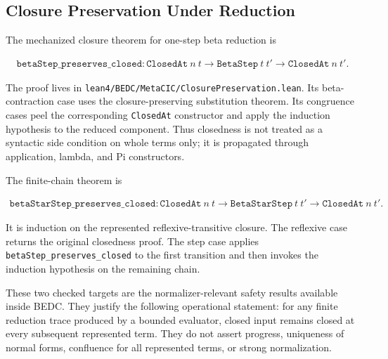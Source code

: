 \subsection{Closure Preservation Under Reduction}
\label{subsec:metacic-normalization-closure}

The mechanized closure theorem for one-step beta reduction is

$$
\begin{aligned}
  \texttt{betaStep\_preserves\_closed} :
  \texttt{ClosedAt}\ n\ t \to
  \texttt{BetaStep}\ t\ t' \to
  \texttt{ClosedAt}\ n\ t' .
\end{aligned}
$$

The proof lives in
\texttt{lean4/BEDC/MetaCIC/ClosurePreservation.lean}. Its beta-contraction
case uses the closure-preserving substitution theorem. Its congruence cases
peel the corresponding \texttt{ClosedAt} constructor and apply the induction
hypothesis to the reduced component. Thus closedness is not treated as a
syntactic side condition on whole terms only; it is propagated through
application, lambda, and Pi constructors.

The finite-chain theorem is

$$
\begin{aligned}
  \texttt{betaStarStep\_preserves\_closed} :
  \texttt{ClosedAt}\ n\ t \to
  \texttt{BetaStarStep}\ t\ t' \to
  \texttt{ClosedAt}\ n\ t' .
\end{aligned}
$$

It is induction on the represented reflexive-transitive closure. The reflexive
case returns the original closedness proof. The step case applies
\texttt{betaStep\_preserves\_closed} to the first transition and then invokes
the induction hypothesis on the remaining chain.


These two checked targets are the normalizer-relevant safety results available
inside BEDC. They justify the following operational statement: for any finite
reduction trace produced by a bounded evaluator, closed input remains closed
at every subsequent represented term. They do not assert progress, uniqueness
of normal forms, confluence for all represented terms, or strong
normalization.

